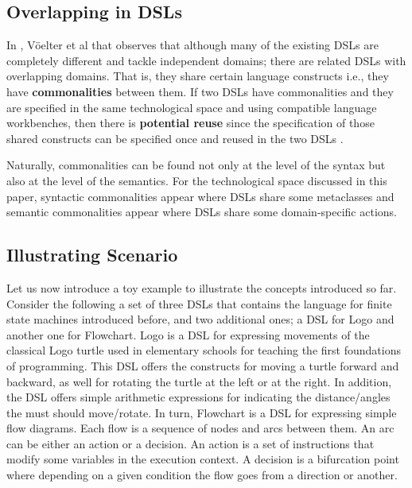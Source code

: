 
\subsection{Overlapping in DSLs}

In \cite[p. 60-61]{voelter:2013}, V\"oelter et al  that observes that although many of the existing DSLs are completely different and tackle independent domains; there are related DSLs with overlapping domains. That is, they share certain language constructs i.e., they have \textbf{commonalities} between them. If two DSLs have commonalities and they are specified in the same technological space and using compatible language workbenches, then there is \textbf{potential reuse} since the specification of those shared constructs can be specified once and reused in the two DSLs \cite[p. 60-61]{voelter:2013}.

Naturally, commonalities can be found not only at the level of the syntax but also at the level of the semantics. For the technological space discussed in this paper, syntactic commonalities appear where DSLs share some metaclasses and semantic commonalities appear where DSLs share some domain-specific actions.

\subsection{Illustrating Scenario}

Let us now introduce a toy example to illustrate the concepts introduced so far. Consider the following a set of three DSLs that contains the language for finite state machines introduced before, and two additional ones; a DSL for Logo and another one for Flowchart. Logo is a DSL for expressing movements of the classical Logo turtle used in elementary schools for teaching the first foundations of programming. This DSL offers the constructs for moving a turtle forward and backward, as well for rotating the turtle at the left or at the right. In addition, the DSL offers simple arithmetic expressions for indicating the distance/angles the must should move/rotate. In turn, Flowchart is a DSL for expressing simple flow diagrams. Each flow is a sequence of nodes and arcs between them. An arc can be either an action or a decision. An action is a set of instructions that modify some variables in the execution context. A decision is a bifurcation point where depending on a given condition the flow goes from a direction or another. 

